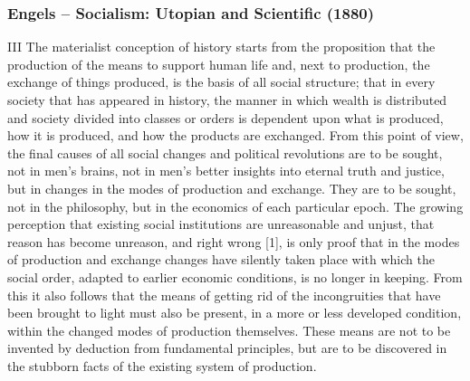 \documentclass[final]{beamer}
\begin{document}
\begin{frame}
\frametitle{Engels -- Socialism: Utopian and Scientific (1880)}
\centering III
\tiny{
The materialist conception of history starts from the proposition that the production of the means to support human life and, next to production, the exchange of things produced, is the basis of all social structure; that in every society that has appeared in history, the manner in which wealth is distributed and society divided into classes or orders is dependent upon what is produced, how it is produced, and how the products are exchanged. From this point of view, the final causes of all social changes and political revolutions are to be sought, not in men's brains, not in men's better insights into eternal truth and justice, but in changes in the modes of production and exchange. They are to be sought, not in the philosophy, but in the economics of each particular epoch. The growing perception that existing social institutions are unreasonable and unjust, that reason has become unreason, and right wrong [1], is only proof that in the modes of production and exchange changes have silently taken place with which the social order, adapted to earlier economic conditions, is no longer in keeping. From this it also follows that the means of getting rid of the incongruities that have been brought to light must also be present, in a more or less developed condition, within the changed modes of production themselves. These means are not to be invented by deduction from fundamental principles, but are to be discovered in the stubborn facts of the existing system of production.
}
\end{frame}
\end{document}

